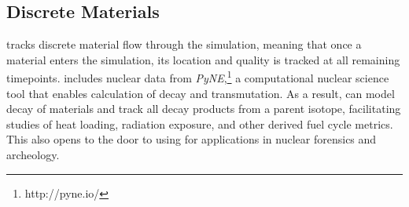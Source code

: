 \subsection{Discrete Materials}
\Cyclus tracks discrete material flow through the simulation, meaning that once a material enters the simulation, its location and quality is tracked at all remaining timepoints\cite{huff_integrated:_2013}.  \Cyclus includes nuclear data from \emph{PyNE},\footnote{http://pyne.io/} a computational nuclear science tool that enables calculation of decay and transmutation\cite{Scopatz2012b}. As a result, \Cyclus can  model decay of materials and track all decay products from a parent isotope, facilitating studies of heat loading, radiation exposure, and other derived fuel cycle metrics\cite{scopatz_cymetric_2015}. This also opens to the door to using \Cyclus for applications in nuclear forensics and archeology.
